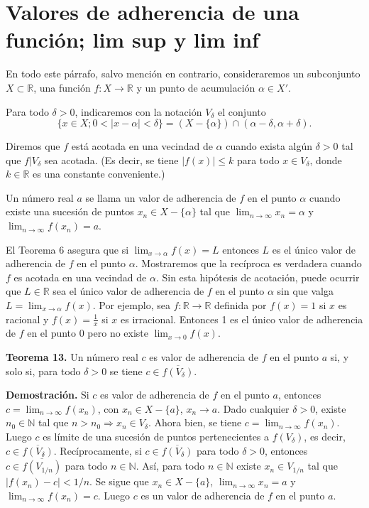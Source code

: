\documentclass[12pt,oneside]{book}
\begin{document}
\section{Valores de adherencia de una función; lim sup y lim inf}

En todo este párrafo, salvo mención en contrario, consideraremos un subconjunto \(X \subset \mathbb{R}\), una función \(f: X \to \mathbb{R}\) y un punto de acumulación \(\alpha \in X'\).

Para todo \(\delta > 0\), indicaremos con la notación \(V_\delta\) el conjunto
\[
\{x \in X; 0 < |x - \alpha| < \delta\} = (X - \{\alpha\}) \cap (\alpha - \delta, \alpha + \delta).
\]

Diremos que \(f\) está acotada en una vecindad de \(\alpha\) cuando exista algún \(\delta > 0\) tal que \(f|V_\delta\) sea acotada. (Es decir, se tiene \(|f(x)| \leq k\) para todo \(x \in V_\delta\), donde \(k \in \mathbb{R}\) es una constante conveniente.)

Un número real \(a\) se llama un valor de adherencia de \(f\) en el punto \(\alpha\) cuando existe una sucesión de puntos \(x_n \in X - \{\alpha\}\) tal que \(\lim_{n \to \infty} x_n = \alpha\) y \(\lim_{n \to \infty} f(x_n) = a\).

El Teorema 6 asegura que si \(\lim_{x \to \alpha} f(x) = L\) entonces \(L\) es el único valor de adherencia de \(f\) en el punto \(\alpha\). Mostraremos que la recíproca es verdadera cuando \(f\) es acotada en una vecindad de \(\alpha\). Sin esta hipótesis de acotación, puede ocurrir que \(L \in \mathbb{R}\) sea el único valor de adherencia de \(f\) en el punto \(\alpha\) sin que valga \(L = \lim_{x \to \alpha} f(x)\). Por ejemplo, sea \(f: \mathbb{R} \to \mathbb{R}\) definida por \(f(x) = 1\) si \(x\) es racional y \(f(x) = \frac{1}{x}\) si \(x\) es irracional. Entonces 1 es el único valor de adherencia de \(f\) en el punto 0 pero no existe \(\lim_{x \to 0} f(x)\).

\textbf{Teorema 13.} Un número real \( c \) es valor de adherencia de \( f \) en el punto \( a \) si, y solo si, para todo \( \delta > 0 \) se tiene \( c \in \overline{f(V_\delta)} \).

\textbf{Demostración.} Si \( c \) es valor de adherencia de \( f \) en el punto \( a \), entonces \( c = \lim_{n \to \infty} f(x_n) \), con \( x_n \in X - \{a\} \), \( x_n \to a \). Dado cualquier \( \delta > 0 \), existe \( n_0 \in \mathbb{N} \) tal que \( n > n_0 \Rightarrow x_n \in V_\delta \). Ahora bien, se tiene \( c = \lim_{n \to \infty} f(x_n) \). Luego \( c \) es límite de una sucesión de puntos pertenecientes a \( f(V_\delta) \), es decir, \( c \in \overline{f(V_\delta)} \). Recíprocamente, si \( c \in \overline{f(V_\delta)} \) para todo \( \delta > 0 \), entonces \( c \in \overline{f(V_{1/n})} \) para todo \( n \in \mathbb{N} \). Así, para todo \( n \in \mathbb{N} \) existe \( x_n \in V_{1/n} \) tal que \( |f(x_n) - c| < 1/n \). Se sigue que \( x_n \in X - \{a\} \), \( \lim_{n \to \infty} x_n = a \) y \( \lim_{n \to \infty} f(x_n) = c \). Luego \( c \) es un valor de adherencia de \( f \) en el punto \( a \).
\end{document}
